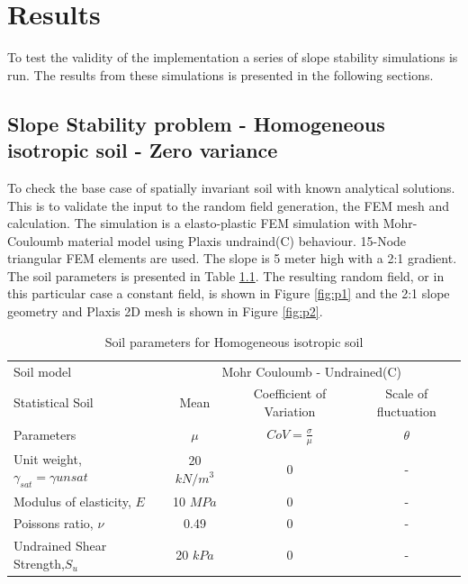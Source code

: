 \chapter[Results]{Results}
To test the validity of the implementation a series of slope stability simulations is run.
The results from these simulations is presented in the following sections.


\section{Slope Stability problem - Homogeneous isotropic soil - Zero variance}

To check the base case of spatially invariant soil with known analytical solutions. This is to validate the input to the random field generation, the FEM mesh and calculation. The simulation is a elasto-plastic FEM simulation with Mohr-Couloumb material model using Plaxis undraind(C) behaviour. 15-Node triangular FEM elements are used. The slope is 5 meter high with a 2:1 gradient.
The soil parameters is presented in Table \ref{tab1}. The resulting random field, or in this particular case a constant field, is shown in Figure \ref{fig:p1} and the 2:1 slope geometry and Plaxis 2D mesh is shown in Figure \ref{fig:p2}.


\begin{table}[h]
	\centering\small
	\caption{Soil parameters for Homogeneous isotropic soil}
	\label{tab1}
		\begin{tabular*}{\textwidth}{@{\extracolsep{\fill}}lccc}
			\toprule
			 Soil model  &\multicolumn{3}{c}{Mohr Couloumb - Undrained(C)}\\
  \cmidrule{2-4}
			Statistical Soil	& Mean		 	& Coefficient of Variation 		& Scale of fluctuation \\
			Parameters	  	& $\mu$ 		&  $CoV = \frac{\sigma}{\mu}$ 		& $\theta$ \\
        
			\midrule
			  Unit weight, $\gamma_{sat}=\gamma{unsat}$ & 20 $kN/m^3$ & 0 & - \\
		          Modulus of elasticity, $E$ & 10 $MPa$ & 0 & - \\
		          Poissons ratio, $\nu$ & 0.49 & 0 & - \\
		          Undrained Shear Strength,$S_u$ & 20 $kPa$ & 0 & - \\
			\bottomrule
		\end{tabular*}
\end{table}

